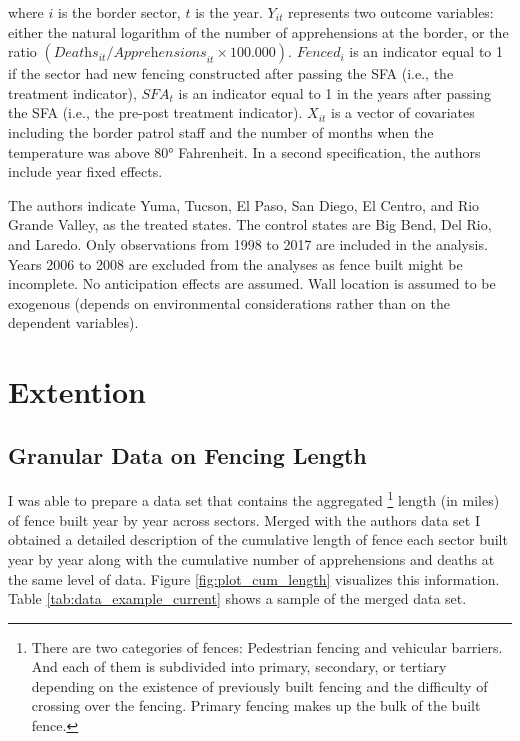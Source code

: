 \documentclass[titlepage]{article}
\begin{document}
where $i$ is the border sector, $t$ is the year. $Y_{it}$ represents two outcome variables: either the natural logarithm of the number of apprehensions at the border, or the ratio $(\textit{Deaths}_{it}/\textit{Apprehensions}_{it} \times 100.000)$. $\textit{Fenced}_{i}$ is an indicator equal to 1 if the  sector had new fencing constructed after passing the SFA (i.e., the treatment indicator), $\textit{SFA}_{t}$ is an indicator equal to 1 in the years after passing the SFA (i.e., the pre-post treatment indicator). $X_{it}$ is a vector of covariates including the border patrol staff and the number of months when the temperature was above $80°$ Fahrenheit. In a second specification, the authors include year fixed effects.

The authors indicate Yuma, Tucson, El Paso, San Diego, El Centro, and Rio Grande Valley, as the treated states. The control states are Big Bend, Del Rio, and Laredo. Only observations from 1998 to 2017 are included in the analysis. Years 2006 to 2008 are excluded from the analyses as fence built might be incomplete. No anticipation effects are assumed. Wall location is assumed to be exogenous (depends on environmental considerations rather than on the dependent variables).



\section*{Extention}

\subsection*{Granular Data on Fencing Length}

I was able to prepare a data set that contains the aggregated \footnote{There are two categories of fences: Pedestrian fencing and vehicular barriers. And each of them is subdivided into primary, secondary, or tertiary depending on the existence of previously built fencing and the difficulty of crossing over the fencing. Primary fencing makes up the bulk of the built fence.} length (in miles) of fence built year by year across sectors. Merged with the authors data set I obtained a detailed description of the cumulative length of fence each sector  built year by year along with the cumulative number of apprehensions and deaths at the same level of data. Figure \ref{fig:plot_cum_length} visualizes this information. Table \ref{tab:data_example_current} shows a sample of the merged data set.
\end{document}
